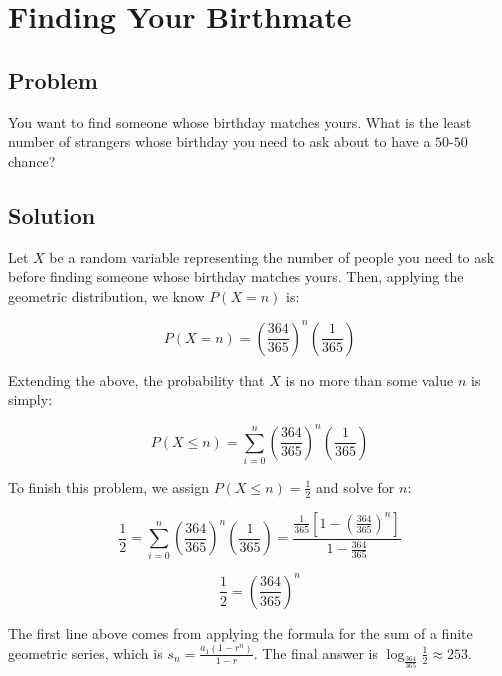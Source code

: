 \documentclass{article}
\date{}
\author{Kaan Aksoy | Feb 27, 2020}
\begin{document}
\maketitle
\section{Finding Your Birthmate}
\subsection{Problem}

You want to find someone whose birthday matches yours. 
What is the least number of strangers whose birthday you 
need to ask about to have a $50$-$50$ chance?

\subsection{Solution}

Let $X$ be a random variable representing the number 
of people you need to ask before finding someone whose 
birthday matches yours. Then, applying the geometric 
distribution, we know $P(X=n)$ is:

$$
P(X=n) = \left(\frac{364}{365}\right)^n
\left(\frac{1}{365}\right)
$$

Extending the above, the probability that $X$ is no more than some value $n$ is simply:

$$
P(X \leq n) = \sum_{i=0}^n \left(\frac{364}{365}\right)^n
\left(\frac{1}{365}\right)
$$


To finish this problem, we assign $P(X \leq n) = \frac{1}{2}$ 
and solve for $n$:

$$
\frac{1}{2} = \sum_{i=0}^n \left(\frac{364}{365}\right)^n
\left(\frac{1}{365}\right) = \frac{\frac{1}{365}\left[1-\left(\frac{364}{365}\right)^n
\right]} {1-\frac{364}{365}}
$$

$$
\frac{1}{2} = \left(\frac{364}{365}\right)^n
$$

The first line above comes from 
applying the formula for the sum of a finite geometric series, 
which is $s_n = \frac{a_1(1-r^n)}{1-r}$. The final answer is 
$\log_\frac{364}{365} \frac{1}{2} \approx 253$.
\end{document}

